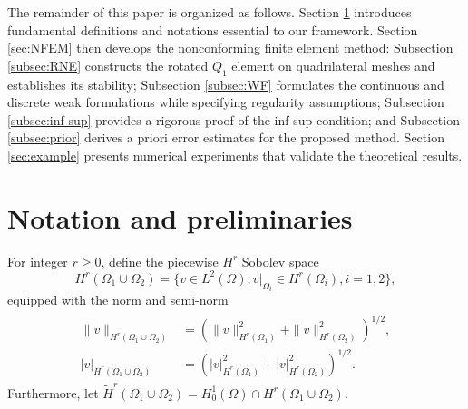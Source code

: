 \documentclass[a4paper,11pt,fleqn]{article}
\numberwithin{equation}{section}
\begin{document}
The remainder of this paper is organized as follows. Section \ref{sec:preliminaries} introduces fundamental definitions and notations essential to our framework. Section \ref{sec:NFEM} then develops the nonconforming finite element method: Subsection \ref{subsec:RNE} constructs the rotated $Q_1$ element on quadrilateral meshes and establishes its stability; Subsection \ref{subsec:WF} formulates the continuous and discrete weak formulations while specifying regularity assumptions; Subsection \ref{subsec:inf-sup} provides a rigorous proof of the inf-sup condition; and Subsection \ref{subsec:prior} derives a priori error estimates for the proposed method. Section \ref{sec:example} presents numerical experiments that validate the theoretical results.

\section{Notation and preliminaries}\label{sec:preliminaries}
	For integer $r\geq 0$, define the piecewise $H^{r}$ Sobolev space
\begin{equation*}
	H^{r}(\Omega_{1}\cup\Omega_{2})=\{v\in L^2(\Omega);v|_{\Omega_{i}}\in H^{r}(\Omega_{i}),i=1,2\},
\end{equation*}
equipped with the norm and semi-norm
\begin{eqnarray*}\label{norm}
	\begin{aligned}
		\|v\|_{H^{r}(\Omega_{1}\cup\Omega_{2})}&=(\|v\|_{H^{r}(\Omega_1)}^{2}
		+\|v\|_{H^{r}(\Omega_2)}^{2})^{1/2},\\
		|v|_{H^{r}(\Omega_{1}\cup\Omega_{2})}&=(|v|_{H^{r}(\Omega_1)}^{2}
		+|v|_{H^{r}(\Omega_2)}^{2})^{1/2}.
	\end{aligned}
\end{eqnarray*}
Furthermore, let $\tilde{H}^{r}(\Omega_1\cup\Omega_2)=H^{1}_{0}(\Omega)\cap H^{r}(\Omega_{1}\cup\Omega_{2}).$
\end{document}
